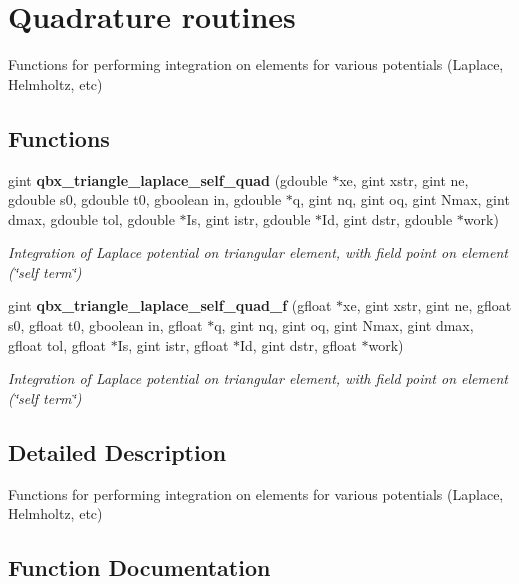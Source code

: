 \section{Quadrature routines}
\label{group__quadrature}


Functions for performing integration on elements for various potentials (Laplace, Helmholtz, etc)  


\subsection*{Functions}
\begin{DoxyCompactItemize}
\item 
gint {\bf qbx\+\_\+triangle\+\_\+laplace\+\_\+self\+\_\+quad} (gdouble $\ast$xe, gint xstr, gint ne, gdouble s0, gdouble t0, gboolean in, gdouble $\ast$q, gint nq, gint oq, gint Nmax, gint dmax, gdouble tol, gdouble $\ast$Is, gint istr, gdouble $\ast$Id, gint dstr, gdouble $\ast$work)
\begin{DoxyCompactList}\small\item\em Integration of Laplace potential on triangular element, with field point on element (\char`\"{}self term\char`\"{}) \end{DoxyCompactList}\item 
gint {\bf qbx\+\_\+triangle\+\_\+laplace\+\_\+self\+\_\+quad\+\_\+f} (gfloat $\ast$xe, gint xstr, gint ne, gfloat s0, gfloat t0, gboolean in, gfloat $\ast$q, gint nq, gint oq, gint Nmax, gint dmax, gfloat tol, gfloat $\ast$Is, gint istr, gfloat $\ast$Id, gint dstr, gfloat $\ast$work)
\begin{DoxyCompactList}\small\item\em Integration of Laplace potential on triangular element, with field point on element (\char`\"{}self term\char`\"{}) \end{DoxyCompactList}\end{DoxyCompactItemize}


\subsection{Detailed Description}
Functions for performing integration on elements for various potentials (Laplace, Helmholtz, etc) 



\subsection{Function Documentation}
